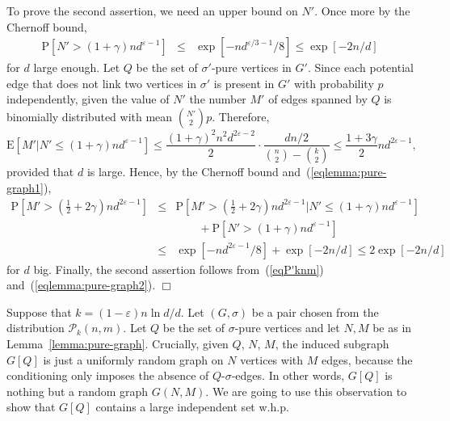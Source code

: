 \documentclass[a4paper,10pt]{article}
\makeatletter
\newenvironment{proof}{\noindent{\bf Proof\@:}}{\hfill $\Box$\\}
\newcommand\cP{\mathcal{P}}
\newcommand\eps{\varepsilon}
\newcommand\Erw{\mathrm{E}}
\newcommand\pr{\mathrm{P}}
\newcommand{\bink}[2] {{{#1}\choose {#2}}}
\newcommand\bc[1]{\left({#1}\right)}
\newcommand\brk[1]{\left\lbrack{#1}\right\rbrack}
\newcommand{\whp}{w.h.p.}
\newcommand\Lem{Lemma}
\newcommand\Thm{Theorem}
\makeatother
\begin{document}
\begin{proof}
To prove the second assertion, we need an upper bound on $N'$.
Once more by the Chernoff bound,
	\begin{eqnarray}\label{eqlemma:pure-graph1}
	\pr\brk{N'>(1+\gamma)nd^{\eps-1}}&\leq&\exp\brk{-nd^{\eps/3-1}/8}\leq\exp\brk{-2n/d}
	\end{eqnarray}
for $d$ large enough.
Let $Q$ be the set of $\sigma'$-pure vertices in $G'$.
Since each potential edge that does not link two vertices in $\sigma'$
is present in $G'$ with probability $p$ independently, given the value
of $N'$ the number $M'$ of edges spanned by $Q$ is binomially distributed
with mean $\bink{N'}2p$.
Therefore,
	$$\Erw\brk{M'|N'\leq(1+\gamma)nd^{\eps-1}}\leq
\frac{(1+\gamma)^2n^2d^{2\eps-2}}{2}\cdot\frac{dn/2}{\bink{n}2-\bink{k}2}\leq\frac{1+3\gamma}2 nd^{2\eps-1},$$
provided that $d$ is large.
Hence, by the Chernoff bound and~(\ref{eqlemma:pure-graph1}),
	\begin{eqnarray}\nonumber
	\pr\brk{M'>\bc{\frac12+2\gamma} nd^{2\eps-1}}&\leq&
		\pr\brk{M'>\bc{\frac12+2\gamma} nd^{2\eps-1}|N'\leq(1+\gamma) nd^{\eps-1}}\\
			&&\qquad+\pr\brk{N'>(1+\gamma) nd^{\eps-1}}\nonumber\\
		&\leq&\exp\brk{-nd^{2\eps-1}/8}+\exp\brk{-2n/d}\leq2\exp\brk{-2n/d}
			\label{eqlemma:pure-graph2}
	\end{eqnarray}
for $d$ big.
Finally, the second assertion follows from~(\ref{eqP'knm}) and~(\ref{eqlemma:pure-graph2}).
\end{proof}


\noindent{\bf Proof of \Thm~\ref{theorem:non-maximal}.}
Suppose that $k=(1-\eps)n\ln d/d$. Let $(G,\sigma)$ be a pair
chosen from the distribution $\cP_k(n,m)$. Let $Q$ be the set
of $\sigma$-pure vertices and let $N,M$ be as in \Lem~\ref{lemma:pure-graph}.
Crucially, given $Q$, $N$, $M$, the induced subgraph $G\brk Q$
is just a uniformly random graph on $N$ vertices with $M$ edges,
because the conditioning only imposes the absence of $Q$-$\sigma$-edges.
In other words, $G\brk Q$ is nothing but a random graph $G(N,M)$.
We are going to use this observation to show that $G\brk Q$
contains a large independent set \whp\
\end{document}

